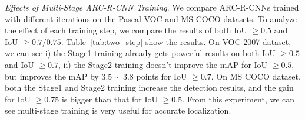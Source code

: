\documentclass[10pt,twocolumn,letterpaper]{article}
\begin{document}
\begin{table} 
\begin{center}
\end{center}
\caption{mAP results with local and global context on PASCAL VOC 2007 test set. Local context is not used for bounding box regression in ARC-R-CNN-Res101-local-global-context$^1$, but used in ARC-R-CNN-Res101-local-global-context$^2$.}
\label{tab:context} 
\vspace{-2mm}
\end{table}

\textit{Effects of Multi-Stage ARC-R-CNN Training}. \label{sec:2step}
We compare ARC-R-CNNs trained with different iterations on the Pascal VOC and MS COCO datasets. 
To analyze the effect of each training step, we compare the results of both IoU $\ge 0.5$ and IoU $\ge 0.7/0.75$.
Table~\ref{tab:two_step} show the results.
On VOC 2007 dataset, we can see i) the Stage1 training already gets powerful results on both IoU $\ge 0.5$ and IoU $\ge 0.7$, ii) the Stage2 training doesn't improve the mAP for IoU $\ge 0.5$,
 but improves the mAP by $3.5 \sim 3.8$ points for IoU $\ge 0.7$.
On MS COCO dataset, both the Stage1 and Stage2 training increase the detection results, and the gain for IoU $\ge 0.75$ is bigger than that for IoU $\ge 0.5$.
From this experiment, we can see multi-stage training is very useful for accurate localization.
\end{document}
